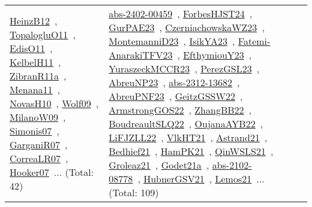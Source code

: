 {\begin{longtable}{lp{3cm}>{\raggedright\arraybackslash}p{6cm}>{\raggedright\arraybackslash}p{6cm}>{\raggedright\arraybackslash}p{8cm}}
\href{works/HeinzB12.pdf}{HeinzB12}~\cite{HeinzB12}, \href{works/TopalogluO11.pdf}{TopalogluO11}~\cite{TopalogluO11}, \href{works/EdisO11.pdf}{EdisO11}~\cite{EdisO11}, \href{works/KelbelH11.pdf}{KelbelH11}~\cite{KelbelH11}, \href{works/ZibranR11a.pdf}{ZibranR11a}~\cite{ZibranR11a}, \href{works/Menana11.pdf}{Menana11}~\cite{Menana11}, \href{works/NovasH10.pdf}{NovasH10}~\cite{NovasH10}, \href{works/Wolf09.pdf}{Wolf09}~\cite{Wolf09}, \href{works/MilanoW09.pdf}{MilanoW09}~\cite{MilanoW09}, \href{works/Simonis07.pdf}{Simonis07}~\cite{Simonis07}, \href{works/GarganiR07.pdf}{GarganiR07}~\cite{GarganiR07}, \href{works/CorreaLR07.pdf}{CorreaLR07}~\cite{CorreaLR07}, \href{works/Hooker07.pdf}{Hooker07}~\cite{Hooker07}... (Total: 42) & \href{works/abs-2402-00459.pdf}{abs-2402-00459}~\cite{abs-2402-00459}, \href{works/ForbesHJST24.pdf}{ForbesHJST24}~\cite{ForbesHJST24}, \href{works/GurPAE23.pdf}{GurPAE23}~\cite{GurPAE23}, \href{works/CzerniachowskaWZ23.pdf}{CzerniachowskaWZ23}~\cite{CzerniachowskaWZ23}, \href{works/MontemanniD23.pdf}{MontemanniD23}~\cite{MontemanniD23}, \href{works/IsikYA23.pdf}{IsikYA23}~\cite{IsikYA23}, \href{works/Fatemi-AnarakiTFV23.pdf}{Fatemi-AnarakiTFV23}~\cite{Fatemi-AnarakiTFV23}, \href{works/EfthymiouY23.pdf}{EfthymiouY23}~\cite{EfthymiouY23}, \href{works/YuraszeckMCCR23.pdf}{YuraszeckMCCR23}~\cite{YuraszeckMCCR23}, \href{works/PerezGSL23.pdf}{PerezGSL23}~\cite{PerezGSL23}, \href{works/AbreuNP23.pdf}{AbreuNP23}~\cite{AbreuNP23}, \href{works/abs-2312-13682.pdf}{abs-2312-13682}~\cite{abs-2312-13682}, \href{works/AbreuPNF23.pdf}{AbreuPNF23}~\cite{AbreuPNF23}, \href{works/GeitzGSSW22.pdf}{GeitzGSSW22}~\cite{GeitzGSSW22}, \href{works/ArmstrongGOS22.pdf}{ArmstrongGOS22}~\cite{ArmstrongGOS22}, \href{works/ZhangBB22.pdf}{ZhangBB22}~\cite{ZhangBB22}, \href{works/BoudreaultSLQ22.pdf}{BoudreaultSLQ22}~\cite{BoudreaultSLQ22}, \href{works/OujanaAYB22.pdf}{OujanaAYB22}~\cite{OujanaAYB22}, \href{works/LiFJZLL22.pdf}{LiFJZLL22}~\cite{LiFJZLL22}, \href{works/VlkHT21.pdf}{VlkHT21}~\cite{VlkHT21}, \href{works/Astrand21.pdf}{Astrand21}~\cite{Astrand21}, \href{works/Bedhief21.pdf}{Bedhief21}~\cite{Bedhief21}, \href{works/HamPK21.pdf}{HamPK21}~\cite{HamPK21}, \href{works/QinWSLS21.pdf}{QinWSLS21}~\cite{QinWSLS21}, \href{works/Groleaz21.pdf}{Groleaz21}~\cite{Groleaz21}, \href{works/Godet21a.pdf}{Godet21a}~\cite{Godet21a}, \href{works/abs-2102-08778.pdf}{abs-2102-08778}~\cite{abs-2102-08778}, \href{works/HubnerGSV21.pdf}{HubnerGSV21}~\cite{HubnerGSV21}, \href{works/Lemos21.pdf}{Lemos21}~\cite{Lemos21}... (Total: 109)\\

\end{longtable}}
